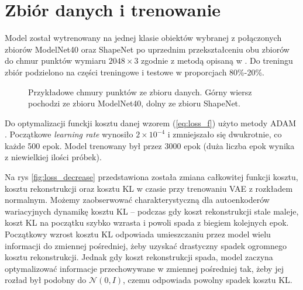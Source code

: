 \documentclass{iithesis}
\begin{document}
%

\section{Zbiór danych i trenowanie} \label{sec:training_process}
Model został wytrenowany na jednej klasie obiektów wybranej z połączonych zbiorów ModelNet40 \cite{modelnet}
oraz ShapeNet \cite{shapenet} po uprzednim przekształceniu obu zbiorów do
chmur punktów wymiaru $2048 \times 3$ zgodnie z metodą opisaną w \cite{pc_convert_method}.
Do treningu zbiór podzielono na części treningowe i testowe w proporcjach 80\%-20\%.

\begin{figure}
    \caption{\label{fig:data_samples} Przykładowe chmury punktów ze zbioru danych.
    Górny wiersz pochodzi ze zbioru ModelNet40, dolny ze zbioru ShapeNet. }
\end{figure}

Do optymalizacji funckji kosztu danej wzorem (\ref{eq:loss_f}) użyto metody ADAM \cite{adam}. Początkowe
\textit{learning rate} wynosiło $2 \times 10^{-4}$ i zmniejszało się dwukrotnie, co każde 500 epok.
Model trenowany był przez 3000 epok (duża liczba epok wynika z niewielkiej ilości próbek).

Na rys \ref{fig:loss_decrease} przedstawiona została zmiana całkowitej funkcji kosztu,
kosztu rekonstrukcji oraz kosztu KL w czasie przy trenowaniu VAE z rozkładem normalnym.
Możemy zaobserwować charakterystyczną dla autoenkoderów
wariacyjnych dynamikę kosztu KL -- podczas gdy koszt rekonstrukcji stale maleje, koszt KL na początku
szybko wzrasta i powoli spada z biegiem kolejnych epok. Początkowy wzrost kosztu KL odpowiada umieszczaniu
przez model wielu informacji do zmiennej pośredniej,
żeby uzyskać drastyczny spadek ogromnego kosztu rekonstrukcji. Jednak gdy koszt rekonstrukcji spada,
model zaczyna optymalizować informacje przechowywane w zmiennej pośredniej
tak, żeby jej rozład był podobny do $\mathcal{N}(0, I)$, czemu odpowiada powolny spadek kosztu KL.
\end{document}
